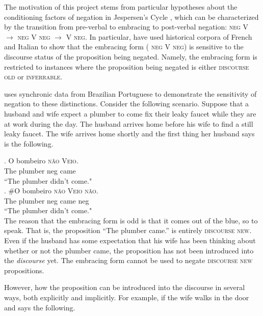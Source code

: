 \documentclass[12pt]{upenndiss}
\theoremstyle{definition} \newtheorem{definition}{Definition}
\begin{document}
The motivation of this project stems from particular hypotheses about the conditioning factors of negation in Jespersen's Cycle \citeyearpar{jespersen:1917}, which can be characterized by the transition from pre-verbal to embracing to post-verbal negation: \textsc{\color{red} neg V} $\rightarrow$ \textsc{\color{blue} neg V neg} $\rightarrow$ \textsc{\color{green} V neg}. In particular, \cite{hansen2009, hansen-visconti2009,hansen-visconti2012} have used historical corpora of French and Italian to show that the embracing form (\textsc{\color{blue} neg V neg}) is sensitive to the discourse status of the proposition being negated. Namely, the embracing form is restricted to instances where the proposition being negated is either \textsc{discourse old} or \textsc{inferrable}.

\cite{schwenter2005,schwenter2006} uses synchronic data from Brazilian Portuguese to demonstrate the sensitivity of negation to these distinctions. Consider the following scenario. Suppose that a husband and wife expect a plumber to come fix their leaky faucet while they are at work during the day. The husband arrives home before his wife to find a still leaky faucet. The wife arrives home shortly and the first thing her husband says is the following.

\exg.  O bombeiro \textsc{\color{red} n{\~a}o} \textsc{\color{red} Veio}.\\
         The plumber neg came\\
         ``The plumber didn't come."\\

\exg. \#O bombeiro \textsc{\color{blue}n{\~a}o} \textsc{\color{blue}Veio} \textsc{\color{blue}n{\~a}o}.\\
	The plumber neg came neg\\
	``The plumber didn't come."\\

The reason that the embracing form is odd is that it comes out of the blue, so to speak. That is, the proposition ``The plumber came.'' is entirely \textsc{discourse new}. Even if the husband has some expectation that his wife has been thinking about whether or not the plumber came, the proposition has not been introduced into the \emph{discourse} yet. The embracing form cannot be used to negate \textsc{discourse new} propositions.

However, how the proposition can be introduced into the discourse in several ways, both explicitly and implicitly. For example, if the wife walks in the door and says the following.
\end{document}
